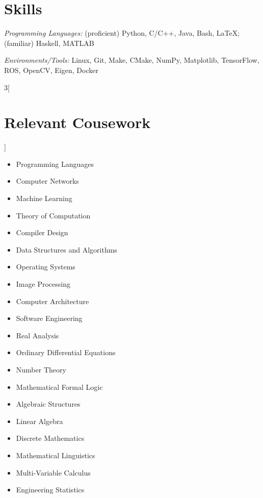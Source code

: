 \documentclass[\ifdefined\cv11pt\else10pt\fi,letterpaper,roman]{moderncv}
\newcommand{\cvonly}[1]{\ifdefined\cv#1\fi}
\let\oldsection\section
\renewcommand{\section}[1]{\vspace*{-1.3ex}\oldsection{#1}\vspace*{-0.5ex}}
\begin{document}
	\section{Skills}
	\textit{Programming Languages:} (proficient) Python, C/C++, Java, Bash, \LaTeX; (familiar) Haskell, MATLAB \par
	\textit{Environments/Tools:} Linux, Git, Make, CMake, NumPy, Matplotlib, TensorFlow, ROS, OpenCV\cvonly{, Eigen, Docker} \par
	\begin{multicols}{3}[\section{Relevant Cousework}\vspace*{-1.2\topsep}]
		\begin{itemize}
			\item Programming Languages
			\item Computer Networks
			\item Machine Learning
			\item Theory of Computation
			\item Compiler Design
			\item Data Structures and Algorithms
			\item Operating Systems
			\item Image Processing
			\item Computer Architecture
			\item Software Engineering
			\item Real Analysis
			\item Ordinary Differential Equations
			\item Number Theory
			\item Mathematical Formal Logic
			\item Algebraic Structures
			\item Linear Algebra
			\item Discrete Mathematics
			\cvonly{
				\item Mathematical Linguistics
				\item Multi-Variable Calculus
				\item Engineering Statistics
			}
		\end{itemize}
	\end{multicols}
	\vspace{-2.8ex}
	
\end{document}
